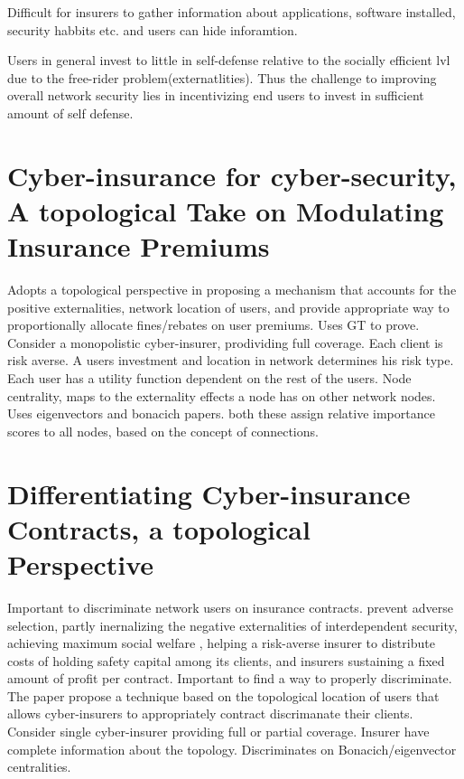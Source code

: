  Difficult for insurers to gather information about applications, software installed, security habbits
  etc. and users can hide inforamtion.
 
Users in general invest to little in self-defense relative to the socially efficient lvl due to the
 free-rider problem(externatlities).  Thus the challenge to improving overall network security lies in
  incentivizing end users to invest in sufficient amount of self defense.
\section{Cyber-insurance for cyber-security, A topological Take on Modulating Insurance Premiums}
Adopts a topological perspective in proposing a mechanism that accounts for the positive
 externalities, network location of users, and provide appropriate way to proportionally allocate
  fines/rebates on user premiums. Uses GT to prove. Consider a monopolistic cyber-insurer, prodividing
   full coverage. Each client is risk averse. A users investment and location in network determines
    his risk type. Each user has a utility function dependent on the rest of the users. 
    Node centrality, maps to the externality effects a node has on other network nodes. Uses
    eigenvectors and bonacich papers. both these assign relative importance scores to all nodes, based on the concept of connections.  

\section{Differentiating Cyber-insurance Contracts, a topological Perspective}
Important to discriminate network users on insurance contracts. prevent adverse selection, partly
 inernalizing the negative externalities of interdependent security, achieving maximum social welfare
 , helping a risk-averse insurer to distribute costs of holding safety capital among its clients, and
  insurers sustaining a fixed amount of profit per contract.
Important to find a way to properly discriminate.
The paper propose a technique based on the topological location of users that allows cyber-insurers to
 appropriately contract discrimanate their clients. Consider single cyber-insurer providing full or
  partial coverage. Insurer have complete information about the topology.
  Discriminates on Bonacich/eigenvector centralities.

